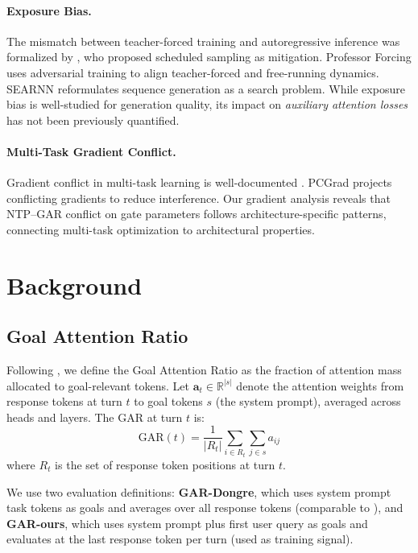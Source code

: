 \documentclass[11pt,a4paper]{article}
\begin{document}
\paragraph{Exposure Bias.}
The mismatch between teacher-forced training and autoregressive inference was formalized by \citet{bengio2015scheduled}, who proposed scheduled sampling as mitigation.
Professor Forcing \citep{lamb2016professor} uses adversarial training to align teacher-forced and free-running dynamics.
SEARNN \citep{leblond2018searnn} reformulates sequence generation as a search problem.
While exposure bias is well-studied for generation quality, its impact on \emph{auxiliary attention losses} has not been previously quantified.

\paragraph{Multi-Task Gradient Conflict.}
Gradient conflict in multi-task learning is well-documented \citep{yu2020gradient,liu2021conflict}.
PCGrad \citep{yu2020gradient} projects conflicting gradients to reduce interference.
Our gradient analysis reveals that NTP--GAR conflict on gate parameters follows architecture-specific patterns, connecting multi-task optimization to architectural properties.

\section{Background}
\label{sec:background}

\subsection{Goal Attention Ratio}

Following \citet{dongre2026multiturn}, we define the Goal Attention Ratio as the fraction of attention mass allocated to goal-relevant tokens.
Let $\mathbf{a}_t \in \mathbb{R}^{|s|}$ denote the attention weights from response tokens at turn $t$ to goal tokens $s$ (the system prompt), averaged across heads and layers.
The GAR at turn $t$ is:
\begin{equation}
    \text{GAR}(t) = \frac{1}{|R_t|} \sum_{i \in R_t} \sum_{j \in s} a_{ij}
\end{equation}
where $R_t$ is the set of response token positions at turn $t$.

We use two evaluation definitions: \textbf{GAR-Dongre}, which uses system prompt task tokens as goals and averages over all response tokens (comparable to \citeauthor{dongre2026multiturn}), and \textbf{GAR-ours}, which uses system prompt plus first user query as goals and evaluates at the last response token per turn (used as training signal).
\end{document}
